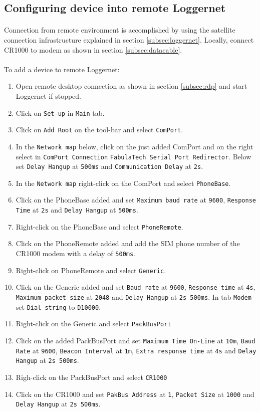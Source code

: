 \subsection{Configuring device into remote Loggernet}
\paragraph{}
Connection from remote environment is accomplished by using the satellite connection infrastructure explained in section \ref{subsec:loggernet}.
Locally, connect CR1000 to modem as shown in section \ref{subsec:datacable}.
\paragraph{}
To add a device to remote Loggernet:
\begin{enumerate}
	\item Open remote desktop connection as shown in section \ref{subsec:rdp} and start Loggernet if stopped.
	\item Click on {\tt Set-up} in {\tt Main} tab.
	\item Click on {\tt Add Root} on the tool-bar and select {\tt ComPort}.
	\item In the {\tt Network map} below, click on the just added ComPort and on the right select in {\tt ComPort Connection} {\tt FabulaTech Serial Port Redirector}. Below set {\tt Delay Hangup} at {\tt 500ms} and {\tt Communication Delay} at {\tt 2s}.
	\item In the {\tt Network map} right-click on the ComPort and select {\tt PhoneBase}.
	\item Click on the PhoneBase added and set {\tt Maximum baud rate} at {\tt 9600}, {\tt Response Time} at {\tt 2s} and {\tt Delay Hangup} at {\tt 500ms}.
	\item Right-click on the PhoneBase and select {\tt PhoneRemote}.
	\item Click on the PhoneRemote added and add the SIM phone number of the CR1000 modem with a delay of {\tt 500ms}.
	\item Right-click on PhoneRemote and select {\tt Generic}.
	\item Click on the Generic added and set {\tt Baud rate} at {\tt 9600}, {\tt Response time} at {\tt 4s}, {\tt Maximum packet size} at {\tt 2048} and {\tt Delay Hangup} at {\tt 2s 500ms}. In tab {\tt Modem} set {\tt Dial string} to {\tt D10000}.
	\item Right-click on the Generic and select {\tt PackBusPort}
	\item Click on the added PackBusPort and set {\tt Maximum Time On-Line} at {\tt 10m}, {\tt Baud Rate} at {\tt 9600}, {\tt Beacon Interval} at {\tt 1m}, {\tt Extra response time} at {\tt 4s} and {\tt Delay Hangup} at {\tt 2s 500ms}.
	\item Righ-click on the PackBusPort and select {\tt CR1000}
	\item Click on the CR1000 and set {\tt PakBus Address} at {\tt 1}, {\tt Packet Size} at {\tt 1000} and {\tt Delay Hangup} at {\tt 2s 500ms}.
\end{enumerate}